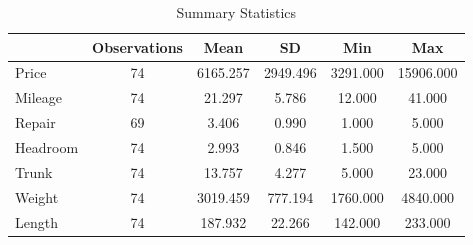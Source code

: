 
\begin{table}[ht]
    \centering
\begin{tabular}{l*{5}{c}} \hline\hline
                    &Observations&        Mean&          SD&         Min&         Max   \\
\hline
Price               &          74&    6165.257&    2949.496&    3291.000&   15906.000\\
Mileage             &          74&      21.297&       5.786&      12.000&      41.000\\
Repair              &          69&       3.406&       0.990&       1.000&       5.000\\
Headroom            &          74&       2.993&       0.846&       1.500&       5.000\\
Trunk               &          74&      13.757&       4.277&       5.000&      23.000\\
Weight              &          74&    3019.459&     777.194&    1760.000&    4840.000\\
Length              &          74&     187.932&      22.266&     142.000&     233.000\\
\hline\hline
\end{tabular}
\caption{Summary Statistics}
\label{paper1_summary_stat}
\end{table}  
